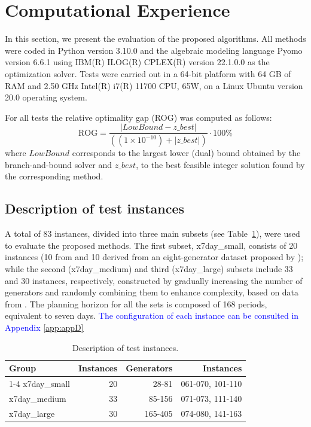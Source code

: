 \section{Computational Experience}
\label{sec:Experimentalwork}

In this section, we present the evaluation
of the proposed algorithms.
All methods were coded in Python version 3.10.0 and the algebraic modeling language Pyomo version 6.6.1 using IBM(R) ILOG(R) CPLEX(R) version 22.1.0.0 as the optimization solver. Tests were carried out in a 64-bit platform with 64 GB of RAM and 2.50 GHz Intel(R) i7(R) 11700 CPU, 65W, on a Linux Ubuntu version 20.0 operating system. 

For all tests the relative optimality gap (ROG) was computed as follows:
%
\begin{equation}
\label{ec:gap}
\text{ROG} = \frac{|LowBound-z\_best|}{((1 \times 10^{-10})+|z\_best|)} \cdot 100 \% \nonumber
\end{equation}
%
where $LowBound$ corresponds to the largest lower (dual) bound obtained by the branch-and-bound solver and $z\_best$, to the best feasible integer solution found by the corresponding method.

\subsection{Description of test instances}  
A total of 83 instances, divided into three main subsets (see Table~\ref{tab:instancesKazarlis}), were used to evaluate the proposed methods. The first subset, x7day\_small, consists of 20 instances (10 from \citet{Morales-Espania2013} and 10 derived from an eight-generator dataset proposed by \citet{Ostrowski2012}); while the second (x7day\_medium) and third (x7day\_large)  subsets include 33 and 30 instances, respectively, constructed by gradually increasing the number of generators and randomly combining them to enhance complexity, based on data from \citet{Ostrowski2012}. The planning horizon for all the sets is composed of 168 periods, equivalent to seven days. 
\textcolor{blue}{The configuration of each instance can be consulted in Appendix \ref{app:appD}}

\begin{table}[htb]
\centering
\caption{Description of test instances.}\label{tab:instancesKazarlis}
\begin{tabular}{lrrr}\toprule
Group &Instances &Generators &Instances  \\\cmidrule{1-4}
x7day\_small &20 &28-81 &061-070, 101-110    \\
x7day\_medium &33 &85-156 &071-073, 111-140  \\
x7day\_large &30 &165-405 &074-080, 141-163 \\
\bottomrule
\end{tabular}
\end{table}


